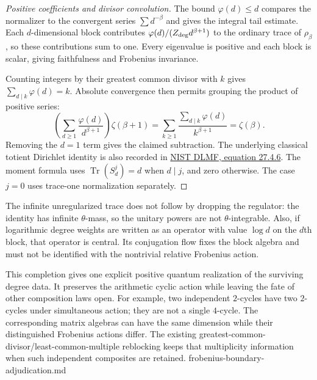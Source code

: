 \begin{proof}[Positive coefficients and divisor convolution]
The bound $\varphi(d)\leq d$ compares the normalizer to the convergent
series $\sum d^{-\beta}$ and gives the integral tail estimate. Each
$d$-dimensional block contributes $\varphi(d)/(Z_{\rm deg}d^{\beta+1})$
to the ordinary trace of $\rho_\beta$, so these contributions sum to one.
Every eigenvalue is positive and each block is scalar, giving faithfulness
and Frobenius invariance.

Counting integers by their greatest common divisor with $k$ gives
$\sum_{d\mid k}\varphi(d)=k$. Absolute convergence then permits grouping
the product of positive series:
\[
 \left(\sum_{d\geq1}\frac{\varphi(d)}{d^{\beta+1}}\right)
 \zeta(\beta+1)
 =\sum_{k\geq1}\frac{\sum_{d\mid k}\varphi(d)}{k^{\beta+1}}
 =\zeta(\beta).
\]
Removing the $d=1$ term gives the claimed subtraction. The underlying
classical totient Dirichlet identity is also recorded in
\href{https://dlmf.nist.gov/27.4.E6}{NIST DLMF, equation 27.4.6}. The moment formula
uses $\operatorname{Tr}(S_d^j)=d$ when $d\mid j$, and zero otherwise.
The case $j=0$ uses trace-one normalization separately.
\end{proof}

The infinite unregularized trace does not follow by dropping the regulator:
the identity has infinite $\theta$-mass, so the unitary powers are not
$\theta$-integrable. Also, if logarithmic degree weights are written as
an operator with value $\log d$ on the $d$th block, that operator is central.
Its conjugation flow fixes the block algebra and must not be identified
with the nontrivial relative Frobenius action.

This completion gives one explicit positive quantum realization of the
surviving degree data. It preserves the arithmetic cyclic action while
leaving the fate of other composition laws open. For example, two
independent $2$-cycles have two $2$-cycles under simultaneous action;
they are not a single $4$-cycle. The corresponding matrix algebras can
have the same dimension while their distinguished Frobenius actions differ.
The existing greatest-common-divisor/least-common-multiple reblocking keeps
that multiplicity information when such independent composites are retained.
{frobenius-boundary-adjudication.md}
